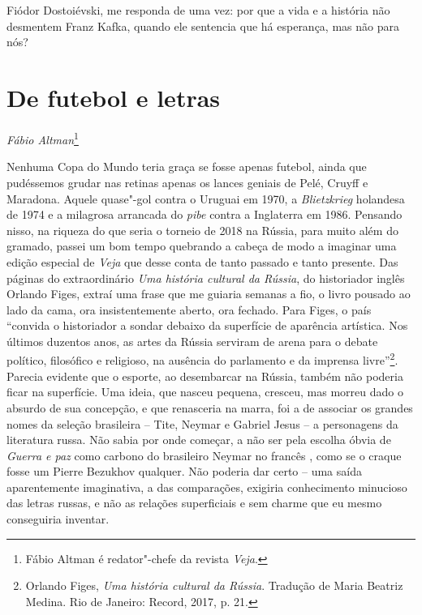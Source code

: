 \chapter*{}

\begin{vplace}[0.7]
Fiódor Dostoiévski, me responda de uma vez: por que a vida e a história não desmentem Franz Kafka, quando ele sentencia que há esperança, mas não para nós?
\end{vplace}
\thispagestyle{empty}

\chapter*{De futebol e letras}

\begin{flushright}
\emph{Fábio Altman}\footnote{{Fábio Altman} é redator"-chefe da revista \emph{Veja}.}
\end{flushright}

Nenhuma Copa do Mundo teria graça se fosse apenas futebol, ainda que
pudéssemos grudar nas retinas apenas os lances geniais de Pelé, Cruyff e
Maradona. Aquele quase"-gol contra o Uruguai em 1970, a
\emph{Blietzkrieg} holandesa de 1974 e a milagrosa arrancada do
\emph{pibe} contra a Inglaterra em 1986. Pensando nisso, na riqueza do
que seria o torneio de 2018 na Rússia, para muito além do gramado,
passei um bom tempo quebrando a cabeça de modo a imaginar uma edição
especial de \emph{Veja} que desse conta de tanto passado e tanto
presente. Das páginas do extraordinário \emph{Uma história cultural da
Rússia}, do historiador inglês Orlando Figes, extraí uma frase que me
guiaria semanas a fio, o livro pousado ao lado da cama, ora
insistentemente aberto, ora fechado. Para Figes, o país ``convida o
historiador a sondar debaixo da superfície de aparência artística. Nos
últimos duzentos anos, as artes da Rússia serviram de arena para o
debate político, filosófico e religioso, na ausência do parlamento e da
imprensa livre''\footnote{Orlando Figes, \emph{Uma história cultural da
  Rússia}. Tradução de Maria Beatriz Medina. Rio de Janeiro: Record,
  2017, p. 21.}. Parecia evidente que o esporte, ao desembarcar na
Rússia, também não poderia ficar na superfície. Uma ideia, que nasceu
pequena, cresceu, mas morreu dado o absurdo de sua concepção, e que
renasceria na marra, foi a de associar os grandes nomes da seleção
brasileira -- Tite, Neymar e Gabriel Jesus -- a personagens da
literatura russa. Não sabia por onde começar, a não ser pela escolha
óbvia de \emph{Guerra e paz} como carbono do brasileiro Neymar no
francês , como se o craque fosse um Pierre Bezukhov qualquer. Não
poderia dar certo -- uma saída aparentemente imaginativa, a das
comparações, exigiria conhecimento minucioso das letras russas, e não as
relações superficiais e sem charme que eu mesmo conseguiria inventar.

